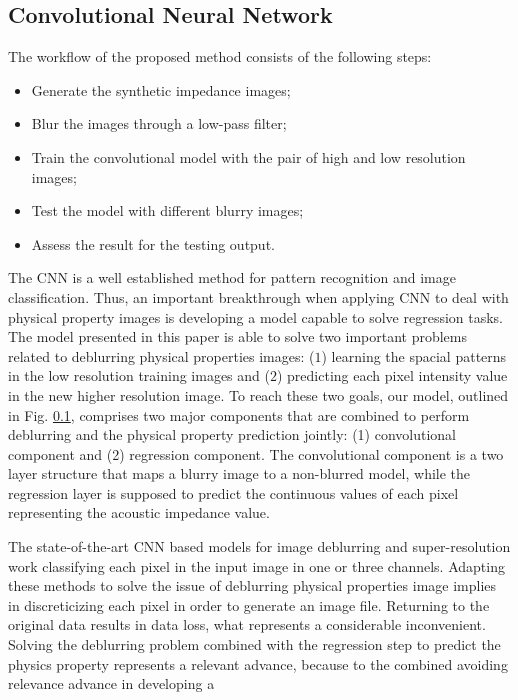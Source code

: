\documentclass[conference,compsoc]{IEEEtran}
\begin{document}
\subsection{Convolutional Neural Network}
The workflow of the proposed method consists of the following
steps:
\begin{itemize}
 \item Generate the synthetic impedance images;
 \item Blur the images through a low-pass filter;
 \item Train the convolutional model with the pair of high and low resolution images;
 \item Test the model with different blurry images;
 \item Assess the result for the testing output.
\end{itemize}

The CNN is a well established method for
pattern recognition and image classification.
Thus, an important breakthrough when applying CNN to
deal with physical property images is developing a model
capable to solve regression tasks. The model presented in this paper
is able to solve two important problems related to deblurring physical properties
images: ($1$) learning the spacial patterns in the low resolution
training images and ($2$) predicting each pixel intensity value in the new
higher resolution image.
To reach these two goals, our model, outlined in Fig. \ref{}, comprises two major
components that are combined to perform deblurring and the physical property prediction
jointly: (1) convolutional component and (2) regression component. The convolutional component
is a two layer structure that maps a blurry image to a non-blurred model, while 
the regression layer is supposed to predict the continuous values of each pixel
representing the acoustic impedance value. 

The state-of-the-art CNN based models for image deblurring \cite{} and super-resolution \cite{}
work classifying each pixel in the input image in one or three channels. 
Adapting these methods to solve the issue of deblurring physical properties image
implies in discreticizing each pixel in order to generate an image file. Returning
to the original data results in data loss, what represents a considerable inconvenient.
Solving the deblurring problem combined with the regression step to predict the physics property represents 
a relevant advance, because to the combined avoiding relevance advance in developing a 
\end{document}

